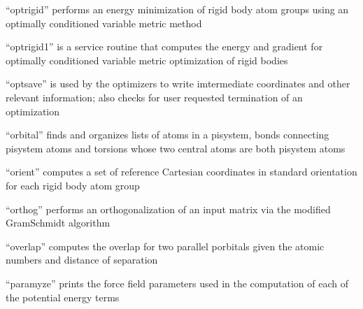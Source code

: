 \documentclass[letterpaper,11pt,english]{sphinxmanual}
\begin{document}
“optrigid” performs an energy minimization of rigid body atom groups using an optimally conditioned variable metric method


“optrigid1” is a service routine that computes the energy and gradient for optimally conditioned variable metric optimization of rigid bodies


“optsave” is used by the optimizers to write imtermediate coordinates and other relevant information; also checks for user requested termination of an optimization


“orbital” finds and organizes lists of atoms in a pisystem, bonds connecting pisystem atoms and torsions whose two central atoms are both pisystem atoms


“orient” computes a set of reference Cartesian coordinates in standard orientation for each rigid body atom group


“orthog” performs an orthogonalization of an input matrix via the modified Gram\sphinxhyphen{}Schmidt algorithm


“overlap” computes the overlap for two parallel p\sphinxhyphen{}orbitals given the atomic numbers and distance of separation


“paramyze” prints the force field parameters used in the computation of each of the potential energy terms









\end{document}

